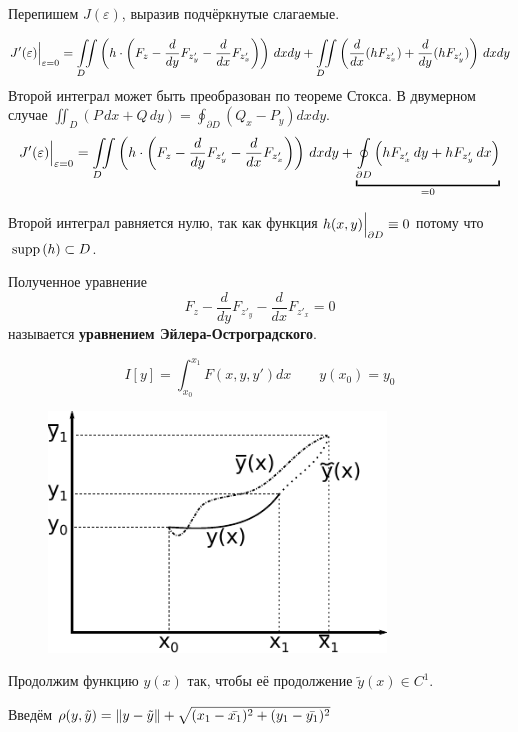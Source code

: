 \documentclass[12pt]{article}
\begin{document}
	Перепишем $J(\varepsilon)$, выразив подчёркнутые слагаемые.
	
	$$
			J'(\varepsilon)\Big|_{\varepsilon = 0}^{} = 
			\underset{D\hspace{10pt}}{\iint} \left( h\cdot\left(F_z - \frac{d}{dy}F_{z'_y} - \frac{d}{dx}F_{z'_x}\right) \right) \,dxdy
			+ \underset{D\hspace{10pt}}{\iint} \left(\frac{d}{dx}(hF_{z'_x}) + \frac{d}{dy}(hF_{z'_y}) \right) \,dxdy
	$$
	Второй интеграл может быть преобразован по теореме Стокса. В двумерном случае 
	$\iint_{D} (P\,dx + Q\,dy) = \oint_{\partial D} (Q_x - P_y) dx dy$.
	$$
			J'(\varepsilon)\lims{\varepsilon = 0}{} = 
			\underset{D\hspace{10pt}}{\iint} \left( h\cdot\left(F_z - \frac{d}{dy}F_{z'_y} - \frac{d}{dx}F_{z'_x}\right) \right) \,dxdy
			+ \underbracket{\underset{\partial D}{\oint} \left(hF_{z'_x}\,dy + hF_{z'_y}\,dx \right)}_{=0}
	$$
	
	Второй интеграл равняется нулю, так как функция $h(x, y)\Big|_{\partial D}^{} \equiv 0$ потому что $\,\text{supp}\,(h) \subset D$.
	
	Полученное уравнение 
	$$F_z - \frac{d}{dy}F_{z'_y} - \frac{d}{dx}F_{z'_x} = 0$$
	называется \textbf{уравнением Эйлера-Остроградского}.
	
	$$I[y] = \int_{x_0}^{x_1} F(x, y, y')dx \qquad y(x_0) = y_0$$
	
	\begin{figure}
			\includegraphics[width=0.8\textwidth]{./../Graphics/Lectures-12-unknowntask.pdf}
	\end{figure}
	
	Продолжим функцию $y(x)$ так, чтобы её продолжение
	$\tilde{y}(x) \in C^1$.
	
	Введём $\rho(y, \tilde{y}) = 
	\left\| y - \tilde{y} \right\| + \sqrt{(x_1 - \bar{x_1})^2 + (y_1 - \bar{y_1})^2}$
	
\end{document}
